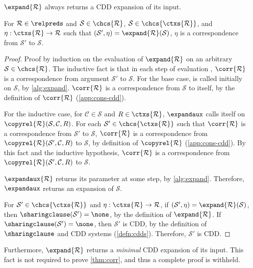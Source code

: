 $\expand{\mathcal{R}}$ always returns a CDD expansion of its input.
%
\begin{lem}
  \label{lem:expand-corr}
  For $\mathcal{R} \in \relpreds$ and $\mathcal{S} \in \chcs{
    \mathcal{R} }$, $\mathcal{S} \in \chcs{ \ctxs{ \mathcal{R} } }$,
  and $\eta : \ctxs{ \mathcal{R} } \to \mathcal{R}$ such that
  $(\mathcal{S}', \eta) = \expand{\mathcal{R}}(\mathcal{S})$, $\eta$
  is a correspondence from $\mathcal{S}'$ to $\mathcal{S}$.
\end{lem}
%
\begin{proof}
  Proof by induction on the evaluation of $\expand{ \mathcal{R} }$ on
  an arbitrary $\mathcal{S} \in \chcs{ \mathcal{R} }$.
  The inductive fact is that in each step of evaluation \expandaux,
  $\corr{ \mathcal{R} }$ is a correspondence from argument
  $\mathcal{S}'$ to $\mathcal{S}$.
  For the base case, \expandaux is called initially on $\mathcal{S}$,
  by \autoref{alg:expand}.
  $\corr{ \mathcal{R} }$ is a correspondence from $\mathcal{S}$ to
  itself, by the definition of $\corr{ \mathcal{R} }$
  (\autoref{app:cons-cdd}).

  For the inductive case, for $\mathcal{C} \in \mathcal{S}$ and $R \in
  \ctxs{ \mathcal{R} }$, $\expandaux$ calls itself on $\copyrel{
    \mathcal{R} }(\mathcal{S}, \mathcal{C}, R)$.
  For each $\mathcal{S}' \in \chcs{ \ctxs{ \mathcal{R} } }$ such that
  $\corr{ \mathcal{R} }$ is a correspondence from $\mathcal{S}'$ to
  $\mathcal{S}$, $\corr{ \mathcal{R} }$ is a correspondence from
  $\copyrel{ \mathcal{R} }( \mathcal{S}', \mathcal{C}, R)$ to
  $\mathcal{S}$, by definition of $\copyrel{ \mathcal{R} }$
  (\autoref{app:cons-cdd}).
  By this fact and the inductive hypothesis, $\corr{ \mathcal{R}}$ is
  a correspondence from $\copyrel{ \mathcal{R} }( \mathcal{S}',
  \mathcal{C}, R)$ to $\mathcal{S}$.

  $\expandaux{ \mathcal{R} }$ returns its parameter at some step, by
  \autoref{alg:expand}.
  Therefore, $\expandaux$ returns an expansion of $\mathcal{S}$.

  For $\mathcal{S}' \in \chcs{ \ctxs{ \mathcal{R} } }$ and $\eta :
  \ctxs{\mathcal{R}} \to \mathcal{R}$, if $(\mathcal{S}', \eta) =
  \expand{ \mathcal{R} }( \mathcal{S} )$, then $\sharingclause(
  \mathcal{S}') = \none$, by the definition of $\expand{ \mathcal{R}
  }$.
  If $\sharingclause(\mathcal{S}') = \none$, then $\mathcal{S}'$ is
  CDD, by the definition of $\sharingclause$ and CDD systems
  (\autoref{defn:cdds}).
  Therefore, $\mathcal{S}'$ is CDD.
\end{proof}
%
Furthermore, $\expand{ \mathcal{R} }$ returns a \emph{minimal} CDD
expansion of its input.
%
This fact is not required to prove \autoref{thm:corr}, and thus a
complete proof is withheld.

